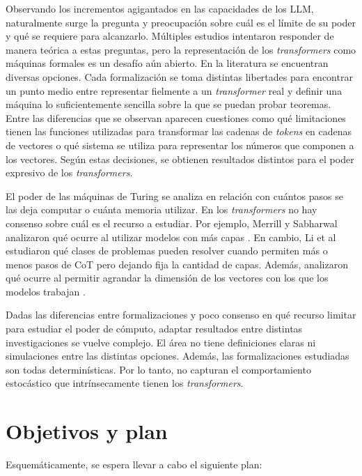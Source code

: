 \documentclass[a4paper,8pt]{article} %
\begin{document}
\medskip

Observando los incrementos agigantados en las capacidades de los LLM, naturalmente surge la pregunta y preocupación sobre cuál es el límite de su poder y qué se requiere para alcanzarlo.
Múltiples estudios intentaron responder de manera teórica a estas preguntas, pero la representación de los \textit{transformers} como máquinas formales es un desafío aún abierto.
En la literatura se encuentran diversas opciones.
Cada formalización se toma distintas libertades para encontrar un punto medio entre representar fielmente a un \textit{transformer} real y definir una máquina lo suficientemente sencilla sobre la que se puedan probar teoremas.
Entre las diferencias que se observan aparecen cuestiones como qué limitaciones tienen las funciones utilizadas para transformar las cadenas de \textit{tokens} en cadenas de vectores o qué sistema se utiliza para representar los números que componen a los vectores.
Según estas decisiones, se obtienen resultados distintos para el poder expresivo de los \textit{transformers}.

\medskip

El poder de las máquinas de Turing se analiza en relación con cuántos pasos se las deja computar o cuánta memoria utilizar.
En los \textit{transformers} no hay consenso sobre cuál es el recurso a estudiar.
Por ejemplo, Merrill y Sabharwal analizaron qué ocurre al utilizar modelos con más capas \cite{log-depth}.
En cambio, Li et al estudiaron qué clases de problemas pueden resolver cuando permiten más o menos pasos de CoT pero dejando fija la cantidad de capas. Además, analizaron qué ocurre al permitir agrandar la dimensión de los vectores con los que los modelos trabajan \cite{toyota}.


Dadas las diferencias entre formalizaciones y poco consenso en qué recurso limitar para estudiar el poder de cómputo, adaptar resultados entre distintas investigaciones se vuelve complejo.
El área no tiene definiciones claras ni simulaciones entre las distintas opciones.
Además, las formalizaciones estudiadas son todas determinísticas.
Por lo tanto, no capturan el comportamiento estocástico que intrínsecamente tienen los \textit{transformers}.




\section*{\Large Objetivos y plan}

Esquemáticamente, se espera llevar a cabo el siguiente plan:
\end{document}

